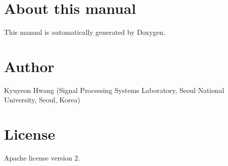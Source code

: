 \hypertarget{index_sec_intro}{}\section{About this manual}\label{index_sec_intro}
This manual is automatically generated by Doxygen. \hypertarget{index_Author}{}\section{Author}\label{index_Author}
Kyuyeon Hwang (Signal Processing Systems Laboratory, Seoul National University, Seoul, Korea) \hypertarget{index_sec_license}{}\section{License}\label{index_sec_license}
Apache license version 2. 